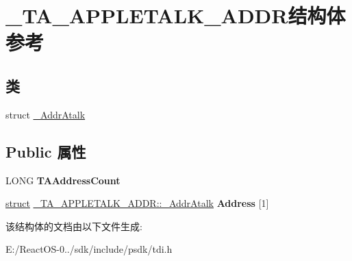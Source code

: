 \hypertarget{struct___t_a___a_p_p_l_e_t_a_l_k___a_d_d_r}{}\section{\+\_\+\+T\+A\+\_\+\+A\+P\+P\+L\+E\+T\+A\+L\+K\+\_\+\+A\+D\+D\+R结构体 参考}
\label{struct___t_a___a_p_p_l_e_t_a_l_k___a_d_d_r}
\subsection*{类}
\begin{DoxyCompactItemize}
\item 
struct \hyperlink{struct___t_a___a_p_p_l_e_t_a_l_k___a_d_d_r_1_1___addr_atalk}{\+\_\+\+Addr\+Atalk}
\end{DoxyCompactItemize}
\subsection*{Public 属性}
\begin{DoxyCompactItemize}
\item 
\mbox{\label{struct___t_a___a_p_p_l_e_t_a_l_k___a_d_d_r_a1291fe23ab12ddcafd1ac070a0d353f1}} 
L\+O\+NG {\bfseries T\+A\+Address\+Count}
\item 
\mbox{\label{struct___t_a___a_p_p_l_e_t_a_l_k___a_d_d_r_aad298b92c3050bcd5eaf2f137d0f4141}} 
\hyperlink{interfacestruct}{struct} \hyperlink{struct___t_a___a_p_p_l_e_t_a_l_k___a_d_d_r_1_1___addr_atalk}{\+\_\+\+T\+A\+\_\+\+A\+P\+P\+L\+E\+T\+A\+L\+K\+\_\+\+A\+D\+D\+R\+::\+\_\+\+Addr\+Atalk} {\bfseries Address} \mbox{[}1\mbox{]}
\end{DoxyCompactItemize}


该结构体的文档由以下文件生成\+:\begin{DoxyCompactItemize}
\item 
E\+:/\+React\+O\+S-\/0../sdk/include/psdk/tdi.\+h\end{DoxyCompactItemize}
